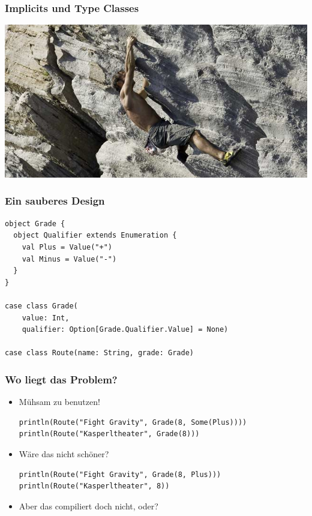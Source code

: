\documentclass{beamer}
\begin{document}
\begin{frame}
  \frametitle{Implicits und Type Classes}
  \includegraphics[width=\linewidth]{img/free-climbing.jpg}
\end{frame}

\begin{frame}[fragile]
  \frametitle{Ein sauberes Design}
    \begin{lstlisting}
object Grade {
  object Qualifier extends Enumeration {
    val Plus = Value("+")
    val Minus = Value("-")
  }
}

case class Grade(
    value: Int, 
    qualifier: Option[Grade.Qualifier.Value] = None)

case class Route(name: String, grade: Grade)
    \end{lstlisting}
\end{frame}

\begin{frame}[fragile]
  \frametitle{Wo liegt das Problem?}
  \begin{itemize}
    \item M\"uhsam zu benutzen!
    \begin{lstlisting}
println(Route("Fight Gravity", Grade(8, Some(Plus))))
println(Route("Kasperltheater", Grade(8)))
    \end{lstlisting}
    \item W\"are das nicht sch\"oner?
    \begin{lstlisting}
println(Route("Fight Gravity", Grade(8, Plus)))
println(Route("Kasperltheater", 8))
    \end{lstlisting}
    \item Aber das compiliert doch nicht, oder?
  \end{itemize}
\end{frame}
\end{document}
